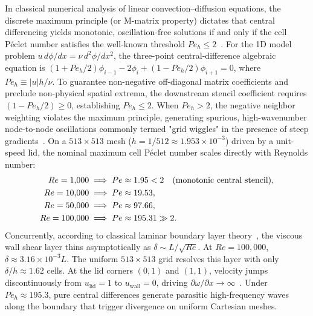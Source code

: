 \documentclass[11pt,a4paper]{article}
\begin{document}
In classical numerical analysis of linear convection--diffusion equations, the discrete maximum principle (or M-matrix property) dictates that central differencing yields monotonic, oscillation-free solutions if and only if the cell P\'eclet number satisfies the well-known threshold $Pe_h \le 2$~\cite{patankar1980numerical,spalding1972novel,roache1998verification,ferziger2002computational}. For the 1D model problem $u \, d\phi/dx = \nu \, d^2\phi/dx^2$, the three-point central-difference algebraic equation is $(1 + Pe_h/2)\phi_{i-1} - 2\phi_i + (1 - Pe_h/2)\phi_{i+1} = 0$, where $Pe_h \equiv |u|h/\nu$. To guarantee non-negative off-diagonal matrix coefficients and preclude non-physical spatial extrema, the downstream stencil coefficient requires $(1 - Pe_h/2) \ge 0$, establishing $Pe_h \le 2$. When $Pe_h > 2$, the negative neighbor weighting violates the maximum principle, generating spurious, high-wavenumber node-to-node oscillations commonly termed "grid wiggles" in the presence of steep gradients~\cite{patankar1980numerical,roache1998verification,ferziger2002computational}. On a $513 \times 513$ mesh ($h = 1/512 \approx 1.953 \times 10^{-3}$) driven by a unit-speed lid, the nominal maximum cell P\'eclet number scales directly with Reynolds number:
\begin{align}
    Re = 1{,}000  &\implies Pe \approx 1.95 < 2 \quad \text{(monotonic central stencil)}, \notag \\
    Re = 10{,}000 &\implies Pe \approx 19.53, \notag \\
    Re = 50{,}000 &\implies Pe \approx 97.66, \notag \\
    Re = 100{,}000 &\implies Pe \approx 195.31 \gg 2.
\end{align}
Concurrently, according to classical laminar boundary layer theory~\cite{prandtl1904uber,schlichting2000boundary}, the viscous wall shear layer thins asymptotically as $\delta \sim L / \sqrt{Re}$. At $Re = 100{,}000$, $\delta \approx 3.16 \times 10^{-3} L$. The uniform $513 \times 513$ grid resolves this layer with only $\delta / h \approx 1.62$ cells. At the lid corners $(0, 1)$ and $(1, 1)$, velocity jumps discontinuously from $u_{\text{lid}} = 1$ to $u_{\text{wall}} = 0$, driving $\partial \omega / \partial x \to \infty$~\cite{botella1998benchmark,bruneau20062d}. Under $Pe_h \approx 195.3$, pure central differences generate parasitic high-frequency waves along the boundary that trigger divergence on uniform Cartesian meshes.
\end{document}
